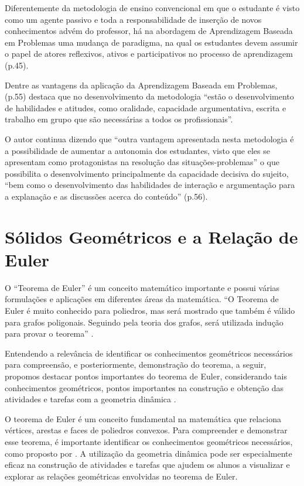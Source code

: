 \begin{citacao}
    Diferentemente da metodologia de ensino convencional em que o estudante é visto como um agente passivo e toda a responsabilidade de inserção de novos conhecimentos advém do professor, há na abordagem de Aprendizagem Baseada em Problemas uma mudança de paradigma, na qual os estudantes devem assumir o papel de atores reflexivos, ativos e participativos no processo de aprendizagem \cite{NUNES2022} (p.45).
\end{citacao}

Dentre as vantagens da aplicação da Aprendizagem Baseada em Problemas,  (p.55) destaca que no desenvolvimento da metodologia ``estão o desenvolvimento de habilidades e atitudes, como oralidade, capacidade argumentativa, escrita e trabalho em grupo que são necessárias a todos os profissionais''.

O autor continua dizendo que ``outra vantagem apresentada nesta metodologia é a possibilidade de aumentar a autonomia dos estudantes, visto que eles se apresentam como protagonistas na resolução das situações-problemas'' o que possibilita o desenvolvimento principalmente da capacidade decisiva do sujeito, ``bem como o desenvolvimento das habilidades de interação e argumentação para a explanação e as discussões acerca do conteúdo'' (p.56).

\section{Sólidos Geométricos e a Relação de Euler}

O ``Teorema de Euler'' é um conceito matemático importante e possui várias formulações e aplicações em diferentes áreas da matemática. ``O Teorema de Euler é muito conhecido para poliedros, mas será mostrado que também é válido para grafos poligonais. Seguindo pela teoria dos grafos, será utilizada indução para provar o teorema'' \cite{OLIVEIRA2021}.

\begin{citacao}
    Entendendo a relevância de identificar os conhecimentos geométricos necessários para compreensão, e posteriormente, demonstração do teorema, a seguir, propomos destacar pontos importantes do teorema de Euler, considerando tais conhecimentos geométricos, pontos importantes na construção e obtenção das atividades e tarefas com a geometria dinâmica  \cite{Pereira2022}.
\end{citacao}

O teorema de Euler é um conceito fundamental na matemática que relaciona vértices, arestas e faces de poliedros convexos. Para compreender e demonstrar esse teorema, é importante identificar os conhecimentos geométricos necessários, como proposto por \cite{Pereira2022}. A utilização da geometria dinâmica pode ser especialmente eficaz na construção de atividades e tarefas que ajudem os alunos a visualizar e explorar as relações geométricas envolvidas no teorema de Euler.

